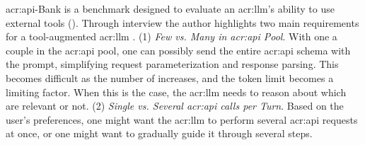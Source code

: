 \acrshort{acr:api}-Bank \citep{liAPIBankComprehensiveBenchmark2023} is a benchmark designed to evaluate an \acrshort{acr:llm}'s ability to use external tools (). Through interview the author highlights two main requirements for a tool-augmented \acrshort{acr:llm} \citep[2]{liAPIBankComprehensiveBenchmark2023}. (1) \textit{Few vs. Many  in \acrshort{acr:api} Pool}. With one a couple  in the \acrshort{acr:api} pool, one can possibly send the entire \acrshort{acr:api} schema with the prompt, simplifying request parameterization and response parsing. This becomes difficult as the number of  increases, and the token limit becomes a limiting factor. When this is the case, the \acrshort{acr:llm} needs to reason about which  are relevant or not. (2) \textit{Single vs. Several \acrshort{acr:api} calls per Turn}. Based on the user's preferences, one might want the \acrshort{acr:llm} to perform several \acrshort{acr:api} requests at once, or one might want to gradually guide it through several steps.



\glsresetall